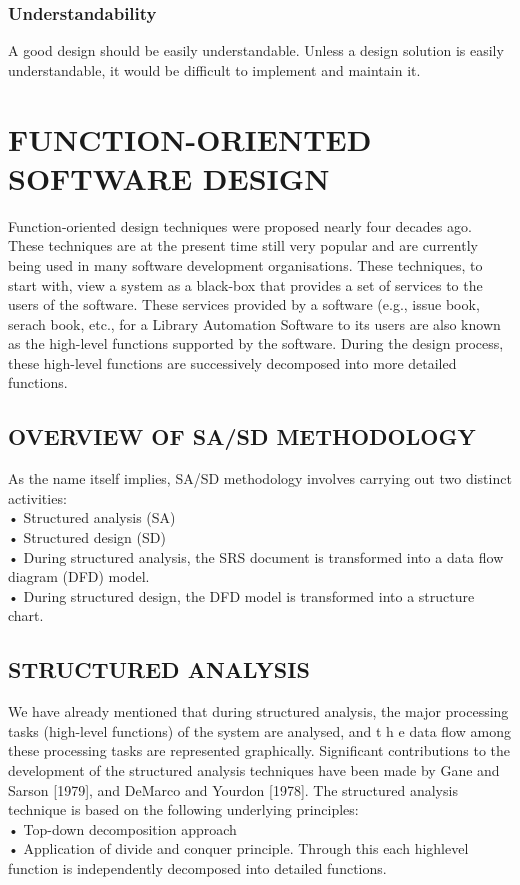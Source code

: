 \documentclass[12pt]{article}
\begin{document}
\subsubsection{Understandability}
A good design should be easily understandable. Unless
a design solution is easily understandable, it would be difficult to implement
and maintain it.
\pagebreak

\section{FUNCTION-ORIENTED SOFTWARE DESIGN}
Function-oriented design techniques were proposed nearly four decades ago.
These techniques are at the present time still very popular and are currently
being used in many software development organisations. These techniques,
to start with, view a system as a black-box that provides a set of services to
the users of the software. These services provided by a software (e.g., issue
book, serach book, etc., for a Library Automation Software to its users are also
known as the high-level functions supported by the software. During the
design process, these high-level functions are successively decomposed into
more detailed functions.
\subsection{ OVERVIEW OF SA/SD METHODOLOGY}
As the name itself implies, SA/SD methodology involves carrying out two
distinct activities:\\
• Structured analysis (SA)\\
• Structured design (SD)\\
• During structured analysis, the SRS document is transformed into a
data flow diagram (DFD) model.\\
• During structured design, the DFD model is transformed into a
structure chart.
\subsection{STRUCTURED ANALYSIS}
We have already mentioned that during structured analysis, the major
processing tasks (high-level functions) of the system are analysed, and
t h e data flow among these processing tasks are represented
graphically. Significant contributions to the development of the
structured analysis techniques have been made by Gane and Sarson
[1979], and DeMarco and Yourdon [1978]. The structured analysis
technique is based on the following underlying principles:\\
• Top-down decomposition approach\\
• Application of divide and conquer principle. Through this each highlevel function is independently decomposed into detailed functions.
\pagebreak
\end{document}
